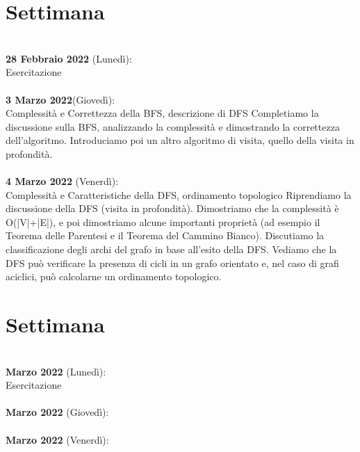 \documentclass{article}
\begin{document}
\section{Settimana}
\\\textbf{28 Febbraio 2022} (Lunedì): \\Esercitazione\\
\\\textbf{3 Marzo 2022}(Giovedì): \\Complessità e Correttezza della BFS, descrizione di DFS
Completiamo la discussione sulla BFS, analizzando la complessità e dimostrando la correttezza dell'algoritmo. Introduciamo poi un altro algoritmo di visita, quello della visita in profondità.\\
\\\textbf{4 Marzo 2022} (Venerdì): \\Complessità e Caratteristiche della DFS, ordinamento topologico
Riprendiamo la discussione della DFS (visita in profondità). Dimostriamo che la complessità è O(|V|+|E|), e poi dimostriamo alcune importanti proprietà (ad esempio il Teorema delle Parentesi e il Teorema del Cammino Bianco). Discutiamo la classificazione degli archi del grafo in base all'esito della DFS. Vediamo che la DFS può verificare la presenza di cicli in un grafo orientato e, nel caso di grafi aciclici, può calcolarne un ordinamento topologico.

\section{Settimana}
\\\textbf{ Marzo 2022} (Lunedì): \\Esercitazione\\
\\\textbf{ Marzo 2022} (Giovedì): \\
\\\textbf{ Marzo 2022} (Venerdì): \\
\end{document}
